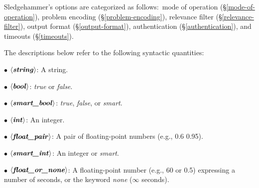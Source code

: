 \documentclass[a4paper,12pt]{article}
\begin{document}
\def\flushitem#1{\item[]\noindent\kern-\leftmargin \textbf{#1}}
\def\qty#1{$\left<\textit{#1}\right>$}
\def\qtybf#1{$\mathbf{\left<\textbf{\textit{#1}}\right>}$}
\def\optrue#1#2{\flushitem{\textit{#1} $\bigl[$= \qtybf{bool}$\bigr]$\enskip \defl\textit{true}\defr\hfill (neg.: \textit{#2})}\nopagebreak\\[\parskip]}
\def\opfalse#1#2{\flushitem{\textit{#1} $\bigl[$= \qtybf{bool}$\bigr]$\enskip \defl\textit{false}\defr\hfill (neg.: \textit{#2})}\nopagebreak\\[\parskip]}
\def\opsmart#1#2{\flushitem{\textit{#1} $\bigl[$= \qtybf{smart\_bool}$\bigr]$\enskip \defl\textit{smart}\defr\hfill (neg.: \textit{#2})}\nopagebreak\\[\parskip]}
\def\opnodefault#1#2{\flushitem{\textit{#1} = \qtybf{#2}} \nopagebreak\\[\parskip]}
\def\opnodefaultbrk#1#2{\flushitem{$\bigl[$\textit{#1} =$\bigr]$ \qtybf{#2}} \nopagebreak\\[\parskip]}
\def\opdefault#1#2#3{\flushitem{\textit{#1} = \qtybf{#2}\enskip \defl\textit{#3}\defr} \nopagebreak\\[\parskip]}
\def\oparg#1#2#3{\flushitem{\textit{#1} \qtybf{#2} = \qtybf{#3}} \nopagebreak\\[\parskip]}
\def\opargbool#1#2#3{\flushitem{\textit{#1} \qtybf{#2} $\bigl[$= \qtybf{bool}$\bigr]$\hfill (neg.: \textit{#3})}\nopagebreak\\[\parskip]}
\def\opargboolorsmart#1#2#3{\flushitem{\textit{#1} \qtybf{#2} $\bigl[$= \qtybf{smart\_bool}$\bigr]$\hfill (neg.: \textit{#3})}\nopagebreak\\[\parskip]}

Sledgehammer's options are categorized as follows:\ mode of operation
(\S\ref{mode-of-operation}), problem encoding (\S\ref{problem-encoding}),
relevance filter (\S\ref{relevance-filter}), output format
(\S\ref{output-format}), authentication (\S\ref{authentication}), and timeouts
(\S\ref{timeouts}).

The descriptions below refer to the following syntactic quantities:

\begin{enum}
\item[$\bullet$] \qtybf{string}: A string.
\item[$\bullet$] \qtybf{bool\/}: \textit{true} or \textit{false}.
\item[$\bullet$] \qtybf{smart\_bool\/}: \textit{true}, \textit{false}, or
\textit{smart}.
\item[$\bullet$] \qtybf{int\/}: An integer.
\item[$\bullet$] \qtybf{float\_pair\/}: A pair of floating-point numbers
(e.g., 0.6 0.95).
\item[$\bullet$] \qtybf{smart\_int\/}: An integer or \textit{smart}.
\item[$\bullet$] \qtybf{float\_or\_none\/}: A floating-point number (e.g., 60 or
0.5) expressing a number of seconds, or the keyword \textit{none} ($\infty$
seconds).
\end{enum}
\end{document}
